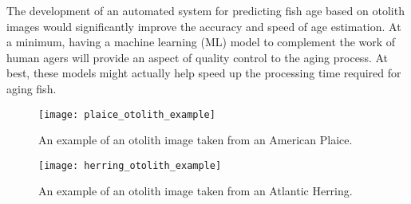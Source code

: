The development of an automated system for predicting fish age based on otolith images would significantly improve the accuracy and speed of age estimation.
At a minimum, having a machine learning (ML) model to complement the work of human agers will provide an aspect of quality control to the aging process.
At best, these models might actually help speed up the processing time required for aging fish.


\begin{figure}
    \texttt{[image: plaice\_otolith\_example]}
    \caption{An example of an otolith image taken from an American Plaice.}
    \label{fig:plaice_oto_example}
\end{figure}

\begin{figure}
    \texttt{[image: herring\_otolith\_example]}
    \caption{An example of an otolith image taken from an Atlantic Herring.}
    \label{fig:herring_oto_example}
\end{figure}

